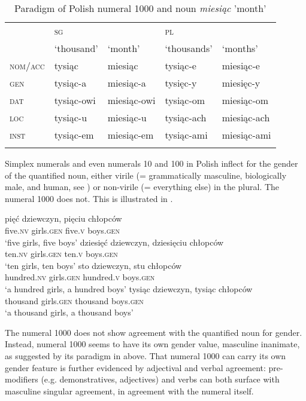 \documentclass[output=paper]{langscibook}
\begin{document}
\begin{table}
\caption{Paradigm of Polish numeral 1000 and noun \textit{miesiąc} 'month'}
\label{klo:tab:Polish1000}
 \begin{tabular}{lllll} 
  \lsptoprule
            & \textsc{sg} & & \textsc{pl} & \\ 
            & `thousand' & `month' & `thousands' & `months'\\
  \midrule
  \textsc{nom}/\textsc{acc}  &   tysiąc & miesiąc & tysiąc-e & miesiąc-e  \\
  \textsc{gen} & tysiąc-a & miesiąc-a & tysięc-y & miesięc-y \\
  \textsc{dat} & tysiąc-owi & miesiąc-owi & tysiąc-om & miesiąc-om \\
  \textsc{loc} & tysiąc-u & miesiąc-u & tysiąc-ach & miesiąc-ach \\
  \textsc{inst} & tysiąc-em & miesiąc-em & tysiąc-ami & miesiąc-ami \\
  \lspbottomrule
 \end{tabular}
\end{table}

Simplex numerals and even numerals 10 and 100 in Polish inflect for the gender of the quantified noun, either virile (= grammatically masculine, biologically male, and human, see \citealt{rappaport2011gender}) or non-virile (= everything else) in the plural. The numeral 1000 does not. This is illustrated in .

\ea \label{klo:ex:5,10,100,1000V.NV} \ea
\gll pięć dziewczyn, pięciu chłopców\\
five.\textsc{nv} girls.\textsc{gen} five.\textsc{v} boys.\textsc{gen}\\
\glt `five girls, five boys'
\ex \gll dziesięć dziewczyn, dziesięciu chłopców\\
ten.\textsc{nv} girls.\textsc{gen} ten.\textsc{v} boys.\textsc{gen}\\
\glt `ten girls, ten boys'
\ex \gll sto dziewczyn, stu chłopców\\
hundred.\textsc{nv} girls.\textsc{gen} hundred.\textsc{v} boys.\textsc{gen}\\
\glt `a hundred girls, a hundred boys'
\ex \gll tysiąc dziewczyn, tysiąc chłopców\\
thousand girls.\textsc{gen} thousand boys.\textsc{gen}\\
\glt `a thousand girls, a thousand boys'
\z \z %

\noindent The numeral 1000 does not show agreement with the quantified noun for gender. Instead, numeral 1000 seems to have its own gender value, masculine inanimate, as suggested by its paradigm in  above. That numeral 1000 can carry its own gender feature is further evidenced by adjectival and verbal agreement: pre-modifiers (e.g. demonstratives, adjectives) and verbs can both surface with masculine singular agreement, in agreement with the numeral itself.
\end{document}
